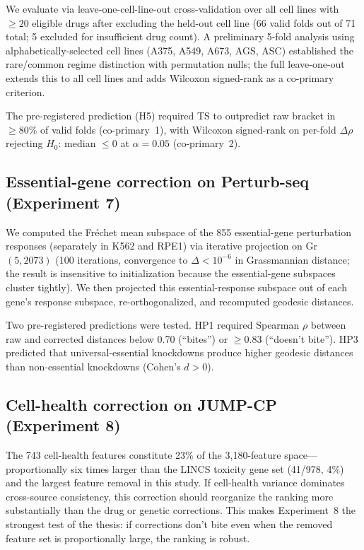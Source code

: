 \documentclass[11pt]{article}
\begin{document}
We evaluate via leave-one-cell-line-out cross-validation over all cell
lines with $\geq 20$ eligible drugs after excluding the held-out cell line
(66 valid folds out of 71 total; 5 excluded for insufficient drug count).
A preliminary 5-fold analysis using alphabetically-selected cell lines
(A375, A549, A673, AGS, ASC) established the rare/common regime distinction
with permutation nulls; the full leave-one-out extends this to all cell
lines and adds Wilcoxon signed-rank as a co-primary criterion.

The pre-registered prediction (H5) required TS to outpredict raw bracket
in $\geq 80\%$ of valid folds (co-primary~1), with Wilcoxon signed-rank on
per-fold $\Delta\rho$ rejecting $H_0$: median $\leq 0$ at $\alpha = 0.05$
(co-primary~2).

\subsection{Essential-gene correction on Perturb-seq (Experiment 7)}

We computed the Fr\'echet mean subspace of the 855 essential-gene
perturbation responses (separately in K562 and RPE1) via iterative
projection on Gr$(5, 2073)$ (100 iterations, convergence to
$\Delta < 10^{-6}$ in Grassmannian distance; the result is insensitive
to initialization because the essential-gene subspaces cluster tightly).
We then projected this essential-response subspace out of each gene's
response subspace, re-orthogonalized, and recomputed geodesic distances.

Two pre-registered predictions were tested.
HP1 required Spearman $\rho$ between raw and corrected distances below
0.70 (``bites'') or $\geq 0.83$ (``doesn't bite'').
HP3 predicted that universal-essential knockdowns produce higher geodesic
distances than non-essential knockdowns (Cohen's $d > 0$).

\subsection{Cell-health correction on JUMP-CP (Experiment 8)}

The 743 cell-health features constitute 23\% of the 3{,}180-feature
space---proportionally six times larger than the LINCS toxicity gene set
(41/978, 4\%) and the largest feature removal in this study. If cell-health
variance dominates cross-source consistency, this correction should
reorganize the ranking more substantially than the drug or genetic
corrections. This makes Experiment~8 the strongest test of the thesis:
if corrections don't bite even when the removed feature set is
proportionally large, the ranking is robust.
\end{document}
